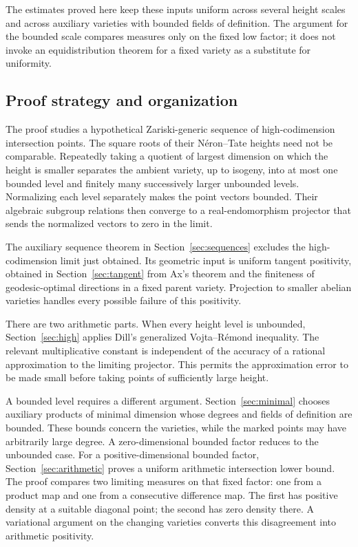The estimates proved here keep these inputs uniform across
several height scales and across auxiliary varieties with bounded
fields of definition. The argument for the bounded scale compares
measures only on the fixed low factor; it does not invoke an
equidistribution theorem for a fixed variety as a substitute for
uniformity.

\subsection{Proof strategy and organization}

The proof studies a hypothetical Zariski-generic sequence of
high-codimension intersection points. The square roots of their
N\'eron--Tate heights need not be comparable. Repeatedly taking a quotient
of largest dimension on which the height is smaller separates the ambient variety,
up to isogeny, into at most one bounded level and finitely many successively
larger unbounded levels. Normalizing each level separately makes the
point vectors bounded. Their algebraic subgroup relations then converge
to a real-endomorphism projector that sends the normalized vectors to
zero in the limit.

The auxiliary sequence theorem in Section~\ref{sec:sequences} excludes
the high-codimension limit just obtained. Its geometric input is uniform tangent
positivity, obtained in Section~\ref{sec:tangent} from Ax's theorem and
the finiteness of geodesic-optimal directions in a fixed parent variety.
Projection to smaller abelian varieties handles every possible failure
of this positivity.

There are two arithmetic parts. When every height level is unbounded,
Section~\ref{sec:high} applies Dill's generalized Vojta--R\'emond
inequality. The relevant multiplicative constant is independent of the
accuracy of a rational approximation to the limiting projector.
This permits the approximation error to be made small before taking
points of sufficiently large height.

A bounded level requires a different argument. Section~\ref{sec:minimal}
chooses auxiliary products of minimal dimension whose degrees and fields
of definition are bounded. These bounds concern the varieties, while
the marked points may have arbitrarily large degree. A zero-dimensional
bounded factor reduces to the unbounded case. For a positive-dimensional
bounded factor, Section~\ref{sec:arithmetic} proves a uniform arithmetic
intersection lower bound. The proof compares two limiting measures on
that fixed factor: one from a product map and one from a consecutive
difference map. The first has positive density at a suitable diagonal
point; the second has zero density there. A variational argument on the
changing varieties converts this disagreement into arithmetic positivity.

